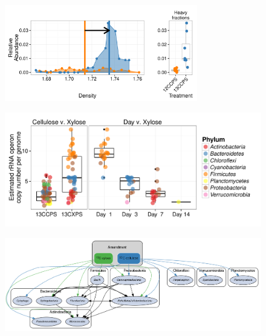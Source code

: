 \begin{figure}[H] \begin{center}
\centerline{\includegraphics[width=0.75\textwidth]{figures/conceptual1/conceptual1.pdf}}
\caption[Density profile for an example "responder"]{\protect}\label{fig:c1}
\end{center} \end{figure}

\begin{figure}[H] \begin{center}
\centerline{\includegraphics[width=\textwidth]{figures/copy_number/copy_number.pdf}}
\caption[OTU \textit{rrn} gene copy number with time and treatment]{\protect}\label{fig:copy}
\end{center} \end{figure}

\begin{figure}[H]
	\begin{center}
    \centerline{\includegraphics[width=\textwidth]{figures/foodweb/foodweb.png}}
    \caption[Soil food web]{\protect}\label{fig:foodweb}
    \end{center} 
\end{figure}

